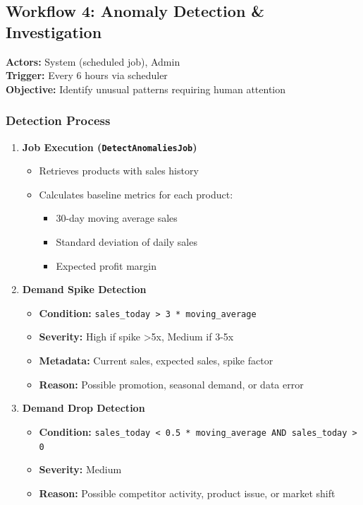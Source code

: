 \subsection{Workflow 4: Anomaly Detection \& Investigation}

\textbf{Actors:} System (scheduled job), Admin\\
\textbf{Trigger:} Every 6 hours via scheduler\\
\textbf{Objective:} Identify unusual patterns requiring human attention

\subsubsection{Detection Process}

\begin{enumerate}[leftmargin=*]
    \item \textbf{Job Execution (\texttt{DetectAnomaliesJob})}
    \begin{itemize}
        \item Retrieves products with sales history
        \item Calculates baseline metrics for each product:
        \begin{itemize}
            \item 30-day moving average sales
            \item Standard deviation of daily sales
            \item Expected profit margin
        \end{itemize}
    \end{itemize}
    
    \item \textbf{Demand Spike Detection}
    \begin{itemize}
        \item \textbf{Condition:} \texttt{sales\_today > 3 * moving\_average}
        \item \textbf{Severity:} High if spike >5x, Medium if 3-5x
        \item \textbf{Metadata:} Current sales, expected sales, spike factor
        \item \textbf{Reason:} Possible promotion, seasonal demand, or data error
    \end{itemize}
    
    \item \textbf{Demand Drop Detection}
    \begin{itemize}
        \item \textbf{Condition:} \texttt{sales\_today < 0.5 * moving\_average AND sales\_today > 0}
        \item \textbf{Severity:} Medium
        \item \textbf{Reason:} Possible competitor activity, product issue, or market shift
    \end{itemize}
    

\end{enumerate}
